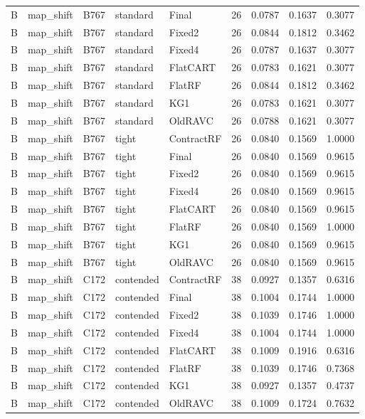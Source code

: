 \begin{longtable}{@{}lllllllll@{}}
B & map\_shift & B767 & standard & Final & 26 & 0.0787 & 0.1637 & 0.3077\\
B & map\_shift & B767 & standard & Fixed2 & 26 & 0.0844 & 0.1812 & 0.3462\\
B & map\_shift & B767 & standard & Fixed4 & 26 & 0.0787 & 0.1637 & 0.3077\\
B & map\_shift & B767 & standard & FlatCART & 26 & 0.0783 & 0.1621 & 0.3077\\
B & map\_shift & B767 & standard & FlatRF & 26 & 0.0844 & 0.1812 & 0.3462\\
B & map\_shift & B767 & standard & KG1 & 26 & 0.0783 & 0.1621 & 0.3077\\
B & map\_shift & B767 & standard & OldRAVC & 26 & 0.0788 & 0.1621 & 0.3077\\
B & map\_shift & B767 & tight & ContractRF & 26 & 0.0840 & 0.1569 & 1.0000\\
B & map\_shift & B767 & tight & Final & 26 & 0.0840 & 0.1569 & 0.9615\\
B & map\_shift & B767 & tight & Fixed2 & 26 & 0.0840 & 0.1569 & 0.9615\\
B & map\_shift & B767 & tight & Fixed4 & 26 & 0.0840 & 0.1569 & 0.9615\\
B & map\_shift & B767 & tight & FlatCART & 26 & 0.0840 & 0.1569 & 0.9615\\
B & map\_shift & B767 & tight & FlatRF & 26 & 0.0840 & 0.1569 & 1.0000\\
B & map\_shift & B767 & tight & KG1 & 26 & 0.0840 & 0.1569 & 0.9615\\
B & map\_shift & B767 & tight & OldRAVC & 26 & 0.0840 & 0.1569 & 0.9615\\
B & map\_shift & C172 & contended & ContractRF & 38 & 0.0927 & 0.1357 & 0.6316\\
B & map\_shift & C172 & contended & Final & 38 & 0.1004 & 0.1744 & 1.0000\\
B & map\_shift & C172 & contended & Fixed2 & 38 & 0.1039 & 0.1746 & 1.0000\\
B & map\_shift & C172 & contended & Fixed4 & 38 & 0.1004 & 0.1744 & 1.0000\\
B & map\_shift & C172 & contended & FlatCART & 38 & 0.1009 & 0.1916 & 0.6316\\
B & map\_shift & C172 & contended & FlatRF & 38 & 0.1039 & 0.1746 & 0.7368\\
B & map\_shift & C172 & contended & KG1 & 38 & 0.0927 & 0.1357 & 0.4737\\
B & map\_shift & C172 & contended & OldRAVC & 38 & 0.1009 & 0.1724 & 0.7632\\

\end{longtable}
